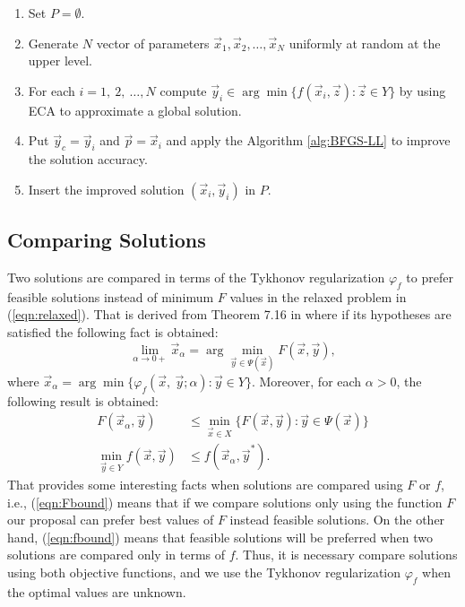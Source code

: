 \documentclass[conference]{IEEEtran}
\theoremstyle{definition}
\begin{document}
\begin{enumerate}
    \item Set $P = \emptyset $.
    \item Generate $N$ vector of parameters $\vec{x}_1, \vec{x}_2, \ldots, \vec{x}_N$
          uniformly at random at the upper level.
    \item For each $i=1,\ 2,\ \ldots,N$ compute
            $\vec{y}_i \in \arg \min \{ f(\vec{x}_i, \vec{z}) : \vec{z} \in Y \}$
          by using ECA to approximate a global solution.
    \item Put $\vec{y}_c = \vec{y}_i$ and $\vec{p} = \vec{x}_i$ and apply the
          Algorithm \ref{alg:BFGS-LL} to improve the solution accuracy.
    \item Insert the improved solution $(\vec{x}_i, \vec{y}_i)$ in $P$.
\end{enumerate}

\subsection{Comparing Solutions} %
\label{sub:comparing_solutions}

Two solutions are compared in terms of the Tykhonov regularization $\varphi_f$
to prefer feasible solutions instead of minimum $F$ values in the relaxed problem
in (\ref{eqn:relaxed}). That is derived from Theorem 7.16 in \cite{dempe2002foundations}
where if its hypotheses are satisfied the following fact is obtained:
% 
\[
    \lim_{\alpha \to 0+} \vec{x}_\alpha = \arg \min_{\vec{y} \in \Psi(\vec{x})} F(\vec{x}, \vec{y}),
\]
%
where $\vec{x}_\alpha = \arg \min\{\varphi_f (\vec{x},\ \vec{y}; \alpha) : \vec{y} \in Y\} $.
Moreover, for each $\alpha > 0$, the following result is obtained:
% 
\begin{align}
    \label{eqn:Fbound}
    F(\vec{x}_\alpha, \vec{y}) &\leq \min_{ \vec{x} \in X} \{ F(\vec{x}, \vec{y}) : \vec{y} \in \Psi(\vec{x}) \} \\
    \label{eqn:fbound}
    \min_{\vec{y} \in Y } f(\vec{x}, \vec{y}) &\leq f(\vec{x}_\alpha, \vec{y}^*).
\end{align}
% 
That provides some interesting facts when solutions are compared using $F$ or $f$,
i.e.,  (\ref{eqn:Fbound}) means that if we compare solutions only using the
function $F$ our proposal can prefer best values of $F$ instead feasible solutions.
On the other hand, (\ref{eqn:fbound}) means that feasible solutions will be
preferred when two solutions are compared only in  terms of $f$. Thus, it is
necessary compare solutions using both objective functions, and we use the Tykhonov
regularization $\varphi_f$ when the optimal values are unknown.
\end{document}
